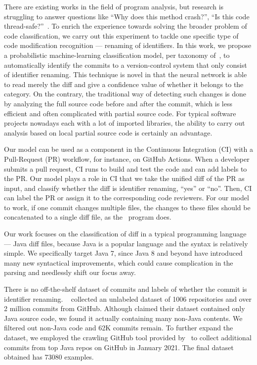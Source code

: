 There are existing works in the field of program analysis,
but research is struggling to answer questions like ``Why does this method crash?'', ``Is this code thread-safe?''~\cite{alexandru2017replicating}.
To enrich the experience towards solving the broader problem of code classification,
we carry out this experiment to tackle one specific type of code modification recognition
--- renaming of identifiers.
In this work, we propose a probabilistic machine-learning classification model,
per taxonomy of~\cite{allamanis2018survey},
to automatically identify the commits to a version-control system that only consist of identifier renaming.
This technique is novel in that the neural network is able to read merely the diff and give a confidence value of whether it belongs to the category.
On the contrary, the traditional way of detecting such changes is done by analyzing the full source code before and after the commit,
which is less efficient and often complicated with partial source code.
For typical software projects nowadays each with a lot of imported libraries,
the ability to carry out analysis based on local partial source code is certainly an advantage.

Our model can be used as a component in the Continuous Integration (CI) with a Pull-Request (PR) workflow, for instance, on GitHub Actions.
When a developer submits a pull request, CI runs to build and test the code and can add labels to the PR.
Our model plays a role in CI that we take the unified diff of the PR as input,
and classify whether the diff is identifier renaming, ``yes'' or ``no''.
Then, CI can label the PR or assign it to the corresponding code reviewers.
For our model to work, if one commit changes multiple files,
the changes to these files should be concatenated to a single diff file,
as the~{\gitdiff} program does.

Our work focuses on the classification of diff in a typical programming language
--- Java diff files,
because Java is a popular language and the syntax is relatively simple.
We specifically target Java 7, since Java 8 and beyond have introduced many new syntactical improvements,
which could cause complication in the parsing and needlessly shift our focus away.

There is no off-the-shelf dataset of commits and labels of whether the commit is identifier renaming.
~\cite{jiang2017} collected an unlabeled dataset of \num{1006} repositories and over 2 million commits from GitHub.
Although  claimed their dataset contained only Java source code,
we found it actually containing many non-Java contents.
We filtered out non-Java code and 62K commits remain.
To further expand the dataset, we employed the crawling GitHub tool provided by~\cite{alexandru2017replicating} to collect additional commits from top Java repos on GitHub in January 2021.
The final dataset obtained has \num{73080} examples.

